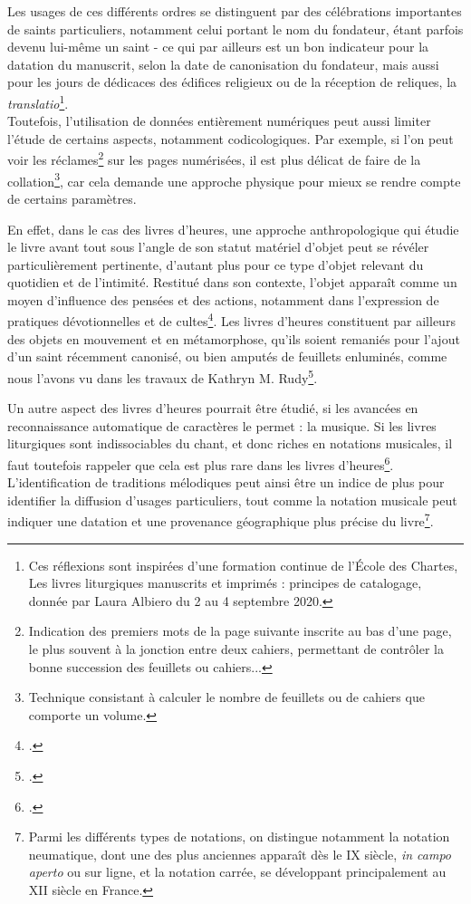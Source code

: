 \documentclass[a4paper,12pt,twoside]{book}
\begin{document}
	Les usages de ces différents ordres se distinguent par des célébrations importantes de saints particuliers, notamment celui portant le nom du fondateur, étant parfois devenu lui-même un saint - ce qui par ailleurs est un bon indicateur pour la datation du manuscrit, selon la date de canonisation du fondateur, mais aussi pour les jours de dédicaces des édifices religieux ou de la réception de reliques, la \textit{translatio}\footnote{Ces réflexions sont inspirées d'une formation continue de l'École des Chartes, \og Les livres liturgiques manuscrits et imprimés : principes de catalogage\fg{}, donnée par Laura Albiero du 2 au 4 septembre 2020.}.\\
	
	Toutefois, l'utilisation de données entièrement numériques peut aussi limiter l'étude de certains aspects, notamment codicologiques. Par exemple, si l'on peut voir les réclames\footnote{\og Indication des premiers mots de la page suivante inscrite au bas d'une page, le plus souvent à la jonction entre deux cahiers, permettant de contrôler la bonne succession des feuillets ou cahiers.\fg{}.\cite{dico_codicologie}.} sur les pages numérisées, il est plus délicat de faire de la collation\footnote{Technique consistant à calculer le nombre de feuillets ou de cahiers que comporte un volume.}, car cela demande une approche physique pour mieux se rendre compte de certains paramètres. 
	
	En effet, dans le cas des livres d'heures, une approche anthropologique qui étudie le livre avant tout sous l'angle de son statut matériel d'objet peut se révéler particulièrement pertinente, d'autant plus pour ce type d'objet relevant du quotidien et de l'intimité. Restitué dans son contexte, l'objet apparaît comme un moyen d'influence des pensées et des actions, notamment dans l'expression de pratiques dévotionnelles et de cultes\footcite[p. 262]{Art_Agency}. Les livres d'heures constituent par ailleurs des objets en mouvement et en métamorphose, qu'ils soient remaniés pour l'ajout d'un saint récemment canonisé, ou bien amputés de feuillets enluminés, comme nous l'avons vu dans les travaux de Kathryn M. Rudy\footcite{Piety_in_Pieces}.
	
	Un autre aspect des livres d'heures pourrait être étudié, si les avancées en reconnaissance automatique de caractères le permet : la musique. Si les livres liturgiques sont indissociables du chant, et donc riches en notations musicales, il faut toutefois rappeler que cela est plus rare dans les livres d'heures\footcite[p. 57]{Music_Livre_Heures}. L'identification de traditions mélodiques peut ainsi être un indice de plus pour identifier la diffusion d'usages particuliers, tout comme la notation musicale peut indiquer une datation et une provenance géographique plus précise du livre\footnote{Parmi les différents types de notations, on distingue notamment la notation neumatique, dont une des plus anciennes apparaît dès le \textsc{IX} siècle, \textit{in campo aperto} ou sur ligne, et la notation carrée, se développant principalement au \textsc{XII} siècle en France.}. \\
	
\end{document}
